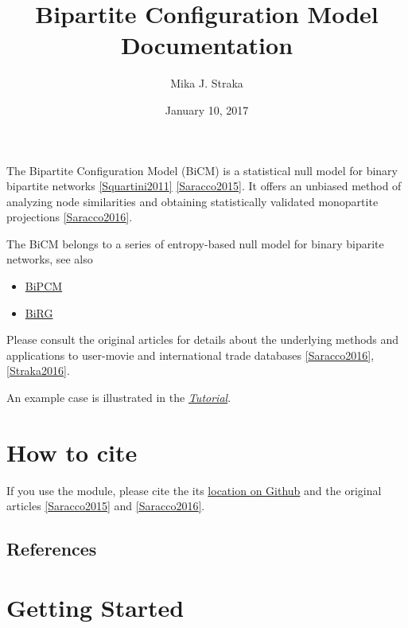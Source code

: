 \documentclass[letterpaper,10pt,english]{sphinxmanual}
\title{Bipartite Configuration Model Documentation}
\date{January 10, 2017}
\author{Mika J. Straka}
\begin{document}
\maketitle
\tableofcontents
{}\label{index::doc}


The Bipartite Configuration Model (BiCM) is a statistical null model for binary
bipartite networks {\hyperref[index:squartini2011]{{[}Squartini2011{]}}} {\hyperref[index:saracco2015]{{[}Saracco2015{]}}}. It offers an unbiased method of analyzing node
similarities and obtaining statistically validated monopartite projections
{\hyperref[index:saracco2016]{{[}Saracco2016{]}}}.

The BiCM belongs to a series of entropy-based null model for binary biparite
networks, see also
\begin{itemize}
\item {} 
\href{https://github.com/tsakim/bipcm}{BiPCM}

\item {} 
\href{https://github.com/tsakim/birg}{BiRG}

\end{itemize}

Please consult the original articles for details about the underlying methods
and applications to user-movie and international trade databases
{\hyperref[index:saracco2016]{{[}Saracco2016{]}}}, {\hyperref[index:straka2016]{{[}Straka2016{]}}}.

An example case is illustrated in the {\hyperref[source/tutorial:tutorial]{\emph{Tutorial}}}.


\chapter{How to cite}
\label{index:bipartite-configuration-model-documentation}\label{index:how-to-cite}
If you use the  module, please cite the its \href{https://github.com/tsakim/bicm}{location on Github} and the original articles {\hyperref[index:saracco2015]{{[}Saracco2015{]}}} and
{\hyperref[index:saracco2016]{{[}Saracco2016{]}}}.


\section{References}
\label{index:references}

\chapter{Getting Started}
\label{index:getting-started}
\end{document}

